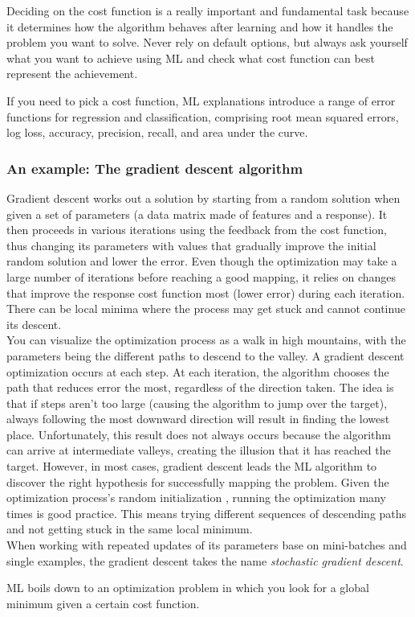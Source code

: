 \begin{mybox}{}
	Deciding on the cost function is a really important and fundamental task because it determines how the algorithm behaves after learning and how it handles the problem you want to solve. Never rely on default options, but always ask yourself what you want to achieve using ML and check what cost function can best represent the achievement.
\end{mybox}
If you need to pick a cost function, ML explanations introduce a range of error functions for regression and classification, comprising root mean squared errors, log loss, accuracy, precision, recall, and area under the curve.
\subsubsection{An example: The gradient descent algorithm}
Gradient descent works out a solution by starting from a random solution when given a set of parameters (a data matrix made of features and a response). It then proceeds in various iterations using the feedback from the cost function, thus changing its parameters with values that gradually improve the initial random solution and lower the error. Even though the optimization may take a large number of iterations before reaching a good mapping, it relies on changes that improve the response cost function most (lower error) during each iteration. There can be local minima where the process may get stuck and cannot continue its descent. \\
You can visualize the optimization process as a walk in high mountains, with the parameters being the different paths to descend to the valley. A gradient descent optimization occurs at each step. At each iteration, the algorithm chooses the path that reduces error the most, regardless of the direction taken. The idea is that if steps aren't too large (causing the algorithm to jump over the target), always following the most downward direction will result in finding the lowest place. Unfortunately, this result does not always occurs because the algorithm can arrive at intermediate valleys, creating the illusion that it has reached the target. However, in most cases, gradient descent leads the ML algorithm to discover the right hypothesis for successfully mapping the problem. Given the optimization process's random initialization , running the optimization many times is good practice. This means trying different sequences of descending paths and not getting stuck in the same local minimum.\\
When working with repeated updates of its parameters base on mini-batches and single examples, the gradient descent takes the name \emph{stochastic gradient descent}.
\\
\begin{mybox}{}
	ML boils down to an optimization problem in which you look for a global minimum given a certain cost function.
\end{mybox}
